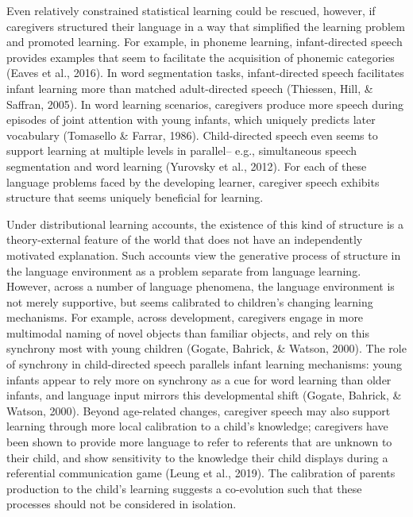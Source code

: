 \documentclass[english,,man,floatsintext]{apa6}
\begin{document}
Even relatively constrained statistical learning could be rescued, however, if caregivers structured their language in a way that simplified the learning problem and promoted learning. For example, in phoneme learning, infant-directed speech provides examples that seem to facilitate the acquisition of phonemic categories (Eaves et al., 2016). In word segmentation tasks, infant-directed speech facilitates infant learning more than matched adult-directed speech (Thiessen, Hill, \& Saffran, 2005). In word learning scenarios, caregivers produce more speech during episodes of joint attention with young infants, which uniquely predicts later vocabulary (Tomasello \& Farrar, 1986). Child-directed speech even seems to support learning at multiple levels in parallel-- e.g., simultaneous speech segmentation and word learning (Yurovsky et al., 2012). For each of these language problems faced by the developing learner, caregiver speech exhibits structure that seems uniquely beneficial for learning.

Under distributional learning accounts, the existence of this kind of structure is a theory-external feature of the world that does not have an independently motivated explanation. Such accounts view the generative process of structure in the language environment as a problem separate from language learning. However, across a number of language phenomena, the language environment is not merely supportive, but seems calibrated to children's changing learning mechanisms. For example, across development, caregivers engage in more multimodal naming of novel objects than familiar objects, and rely on this synchrony most with young children (Gogate, Bahrick, \& Watson, 2000). The role of synchrony in child-directed speech parallels infant learning mechanisms: young infants appear to rely more on synchrony as a cue for word learning than older infants, and language input mirrors this developmental shift (Gogate, Bahrick, \& Watson, 2000). Beyond age-related changes, caregiver speech may also support learning through more local calibration to a child's knowledge; caregivers have been shown to provide more language to refer to referents that are unknown to their child, and show sensitivity to the knowledge their child displays during a referential communication game (Leung et al., 2019). The calibration of parents production to the child's learning suggests a co-evolution such that these processes should not be considered in isolation.
\end{document}
